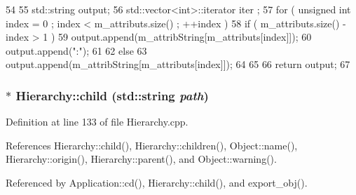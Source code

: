 \begin{DoxyCode}
54                             {
55   std::string output;
56   std::vector<int>::iterator iter ;
57   for ( unsigned int index = 0 ; index < m_attributs.size() ; ++index ) {
58     if ( m_attributs.size() - index > 1 ) {
59       output.append(m_attribString[m_attributs[index]]);
60       output.append(":");
61     }
62     else {
63       output.append(m_attribString[m_attributs[index]]);
64     }
65   }
66   return output;
67 }
\end{DoxyCode}
\hypertarget{classHierarchy_a1e207f973c694b538bf90107b4868817}{
\subsubsection[{child}]{ $\ast$ Hierarchy::child (std::string {\em path})}}
\label{classHierarchy_a1e207f973c694b538bf90107b4868817}


Definition at line 133 of file Hierarchy.cpp.

References Hierarchy::child(), Hierarchy::children(), Object::name(), Hierarchy::origin(), Hierarchy::parent(), and Object::warning().

Referenced by Application::cd(), Hierarchy::child(), and export\_\-obj().


